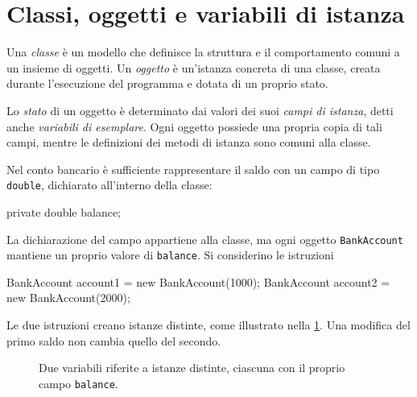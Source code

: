 \clearpage

\section{Classi, oggetti e variabili di istanza}
\label{sec:fi-java-classi-stato}

\begin{definition}
\label{def:fi-java-classi-classe-oggetto}
Una \emph{classe} è un modello che definisce la struttura e
il comportamento comuni a un insieme di oggetti. Un
\emph{oggetto} è un'istanza concreta di una classe, creata
durante l'esecuzione del programma e dotata di un proprio stato.
\end{definition}

\begin{definition}
\label{def:fi-java-classi-stato}
Lo \emph{stato} di un oggetto è determinato dai valori dei suoi
\emph{campi di istanza}, detti anche \emph{variabili di esemplare}.
Ogni oggetto possiede una propria copia di tali campi, mentre
le definizioni dei metodi di istanza sono comuni alla classe.
\end{definition}

Nel conto bancario è sufficiente rappresentare il saldo con
un campo di tipo \texttt{double}, dichiarato all'interno
della classe:

\begin{unipdcode}[language=Java]
private double balance;
\end{unipdcode}

La dichiarazione del campo appartiene alla classe, ma ogni
oggetto \texttt{BankAccount} mantiene un proprio valore di
\texttt{balance}. Si considerino le istruzioni

\begin{unipdcode}[language=Java]
BankAccount account1 = new BankAccount(1000);
BankAccount account2 = new BankAccount(2000);
\end{unipdcode}

Le due istruzioni creano istanze distinte, come illustrato nella
\cref{fig:fi-java-classi-istanze}. Una modifica del primo
saldo non cambia quello del secondo.

\begin{figure}[htbp]
  \centering
  
  \caption{Due variabili riferite a istanze distinte, ciascuna
  con il proprio campo \texttt{balance}.}
  \label{fig:fi-java-classi-istanze}
\end{figure}

